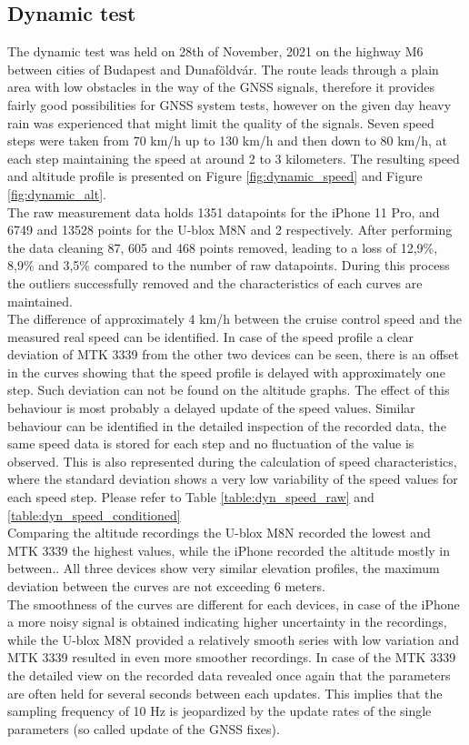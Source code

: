 \documentclass{article}
\begin{document}
		\subsection{Dynamic test}
			The dynamic test was held on 28th of November, 2021 on the highway M6 between cities of Budapest and Dunaföldvár. The route leads through a plain area with low obstacles in the way of the GNSS signals, therefore it provides fairly good possibilities for GNSS system tests, however on the given day heavy rain was experienced that might limit the quality of the signals. Seven speed steps were taken from 70 km/h up to 130 km/h and then down to 80 km/h, at each step maintaining the speed at around 2 to 3 kilometers. The resulting speed and altitude profile is presented on Figure \ref{fig:dynamic_speed} and Figure \ref{fig:dynamic_alt}. \\
			The raw measurement data holds 1351 datapoints for the iPhone 11 Pro, and 6749 and 13528 points for the U-blox M8N and 2 respectively. After performing the data cleaning 87, 605 and 468 points removed, leading to a loss of 12,9\%, 8,9\% and 3,5\% compared to the number of raw datapoints. During this process the outliers successfully removed and the characteristics of each curves are maintained. \\
			The difference of approximately 4 km/h between the cruise control speed and the measured real speed can be identified. In case of the speed profile a clear deviation of MTK 3339 from the other two devices can be seen, there is an offset in the curves showing that the speed profile is delayed with approximately one step. Such deviation can not be found on the altitude graphs. The effect of this behaviour is most probably a delayed update of the speed values. Similar behaviour can be identified in the detailed inspection of the recorded data, the same speed data is stored for each step and no fluctuation of the value is observed. This is also represented during the calculation of speed characteristics, where the standard deviation shows a very low variability of the speed values for each speed step. Please refer to Table \ref{table:dyn_speed_raw} and \ref{table:dyn_speed_conditioned} \\			
			Comparing the altitude recordings the U-blox M8N recorded the lowest and MTK 3339 the highest values, while the iPhone recorded the altitude mostly in between.. All three devices show very similar elevation profiles, the maximum deviation between the curves are not exceeding 6 meters. \\
			The smoothness of the curves are different for each devices, in case of the iPhone a more noisy signal is obtained indicating higher uncertainty in the recordings, while the U-blox M8N provided a relatively smooth series with low variation and MTK 3339 resulted in even more smoother recordings. In case of the MTK 3339 the detailed view on the recorded data revealed once again that the parameters are often held for several seconds between each updates. This implies that the sampling frequency of 10 Hz is jeopardized by the update rates of the single parameters (so called update of the GNSS fixes).
\end{document}
